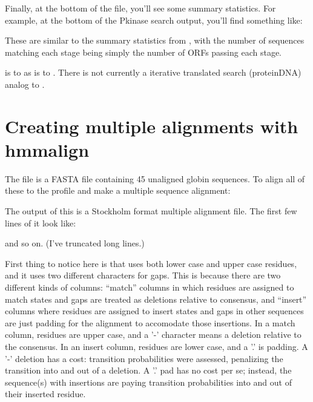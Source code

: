 Finally, at the bottom of the file, you'll see some summary statistics. For
example, at the bottom of the Pkinase search output, you'll find something
like:
      

These are similar to the summary statistics from , 
with the number of sequences matching each stage being simply the
number of ORFs passing each stage.

 is to  as  is to
.  There is not currently a iterative translated
search (protein\textendash{}DNA) analog to .



\section{Creating multiple alignments with hmmalign}

The file  is a FASTA file containing 45
unaligned globin sequences. To align all of these to the
 profile and make a multiple sequence alignment:

   \vspace{1ex}
   \vspace{1ex}

The output of this is a Stockholm format multiple alignment file. The
first few lines of it look like:


and so on. (I've truncated long lines.)

First thing to notice here is that  uses both lower
case and upper case residues, and it uses two different characters for
gaps.  This is because there are two different kinds of columns:
``match'' columns in which residues are assigned to match states and
gaps are treated as deletions relative to consensus, and ``insert''
columns where residues are assigned to insert states and gaps in other
sequences are just padding for the alignment to accomodate those
insertions. In a match column, residues are upper case, and a '-'
character means a deletion relative to the consensus. In an insert
column, residues are lower case, and a '.' is padding.  A '-' deletion
has a cost: transition probabilities were assessed, penalizing the
transition into and out of a deletion. A '.' pad has no cost per se;
instead, the sequence(s) with insertions are paying transition
probabilities into and out of their inserted residue.

